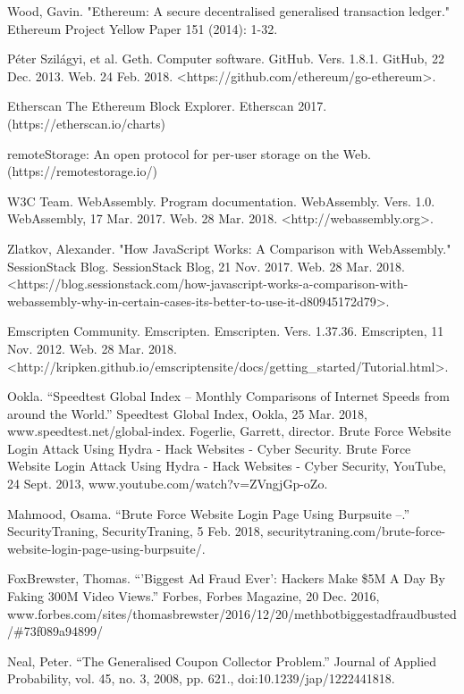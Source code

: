 \documentclass[runningheads]{llncs}
\begin{document}
\begin{thebibliography}{1}
Wood, Gavin. "Ethereum: A secure decentralised generalised transaction ledger." Ethereum Project Yellow Paper 151 (2014): 1-32.

Péter Szilágyi, et al. Geth. Computer software. GitHub. Vers. 1.8.1. GitHub, 22 Dec. 2013. Web. 24 Feb. 2018. <https://github.com/ethereum/go-ethereum>. 

Etherscan The Ethereum Block Explorer. Etherscan 2017. (https://etherscan.io/charts)

 remoteStorage: An open protocol for per-user storage on the Web. (https://remotestorage.io/)

  W3C Team. WebAssembly. Program documentation. WebAssembly. Vers. 1.0. WebAssembly, 17 Mar. 2017. Web. 28 Mar. 2018. <http://webassembly.org>. 

 Zlatkov, Alexander. "How JavaScript Works: A Comparison with WebAssembly." SessionStack Blog. SessionStack Blog, 21 Nov. 2017. Web. 28 Mar. 2018. <https://blog.sessionstack.com/how-javascript-works-a-comparison-with-webassembly-why-in-certain-cases-its-better-to-use-it-d80945172d79>. 

 Emscripten Community. Emscripten. Emscripten. Vers. 1.37.36. Emscripten, 11 Nov. 2012. Web. 28 Mar. 2018. <http://kripken.github.io/emscripten\-site/docs/getting\_started/Tutorial.html>. 

 Ookla. “Speedtest Global Index – Monthly Comparisons of Internet Speeds from around the World.” Speedtest Global Index, Ookla, 25 Mar. 2018, www.speedtest.net/global-index.
  Fogerlie, Garrett, director. Brute Force Website Login Attack Using Hydra - Hack Websites - Cyber Security. Brute Force Website Login Attack Using Hydra - Hack Websites - Cyber Security, YouTube, 24 Sept. 2013, www.youtube.com/watch?v=ZVngjGp-oZo. 

 Mahmood, Osama. “Brute Force Website Login Page Using Burpsuite –.” SecurityTraning, SecurityTraning, 5 Feb. 2018, securitytraning.com/brute-force-website-login-page-using-burpsuite/. 

 Fox\-Brewster, Thomas. ``'Biggest Ad Fraud Ever': Hackers Make \$5M A Day By Faking 300M Video Views.'' Forbes, Forbes Magazine, 20 Dec. 2016, www.forbes.com/sites/thomasbrewster/2016/12/20/methbot\-biggest\-ad\-fraud\-busted/\#73f089a94899/ 

 Neal, Peter. ``The Generalised Coupon Collector Problem.'' Journal of Applied Probability, vol. 45, no. 3, 2008, pp. 621., doi:10.1239/jap/1222441818.
\end{thebibliography}

\addtolength{\textheight}{-7cm}
\balance


\end{document}

